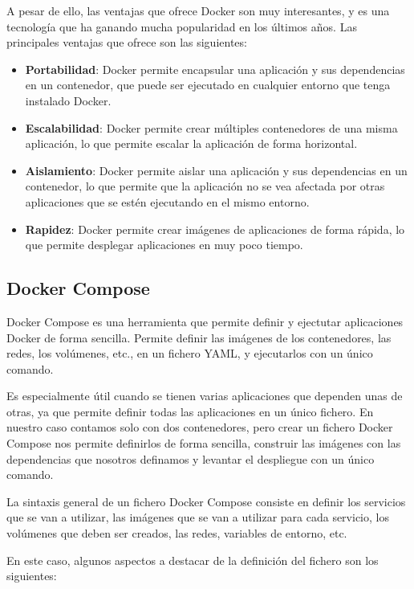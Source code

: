 A pesar de ello, las ventajas que ofrece Docker son muy interesantes, y es una tecnología que ha ganando mucha popularidad en los últimos años.
Las principales ventajas que ofrece son las siguientes:

\begin{itemize}
    \item \textbf{Portabilidad}: Docker permite encapsular una aplicación y sus dependencias en un contenedor, que puede ser ejecutado en cualquier entorno que tenga instalado Docker.
    \item \textbf{Escalabilidad}: Docker permite crear múltiples contenedores de una misma aplicación, lo que permite escalar la aplicación de forma horizontal.
    \item \textbf{Aislamiento}: Docker permite aislar una aplicación y sus dependencias en un contenedor, lo que permite que la aplicación no se vea afectada por otras aplicaciones que se estén ejecutando en el mismo entorno.
    \item \textbf{Rapidez}: Docker permite crear imágenes de aplicaciones de forma rápida, lo que permite desplegar aplicaciones en muy poco tiempo.
\end{itemize}

\subsection{Docker Compose}
Docker Compose es una herramienta que permite definir y ejectutar aplicaciones Docker de forma sencilla.
Permite definir las imágenes de los contenedores, las redes, los volúmenes, etc., en un fichero YAML, y ejecutarlos con un único comando.

Es especialmente útil cuando se tienen varias aplicaciones que dependen unas de otras, ya que permite definir todas las aplicaciones en un único fichero.
En nuestro caso contamos solo con dos contenedores, pero crear un fichero Docker Compose nos permite definirlos de forma sencilla, construir las imágenes con las dependencias que nosotros definamos y levantar el despliegue con un único comando.

La sintaxis general de un fichero Docker Compose consiste en definir los servicios que se van a utilizar, las imágenes que se van a utilizar para cada servicio, los volúmenes que deben ser creados, las redes, variables de entorno, etc.

En este caso, algunos aspectos a destacar de la definición del fichero son los siguientes:

